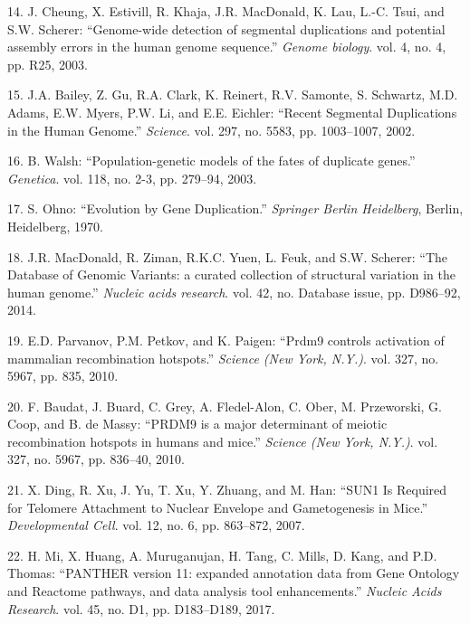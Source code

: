 \documentclass[12pt,twoside]{reedthesis}
\theoremstyle{definition}
\theoremstyle{definition}
\theoremstyle{remark}
\begin{document}
  \hypertarget{ref-Cheung2003}{}
  14. J. Cheung, X. Estivill, R. Khaja, J.R. MacDonald, K. Lau, L.-C.
  Tsui, and S.W. Scherer: ``Genome-wide detection of segmental
  duplications and potential assembly errors in the human genome
  sequence.'' \emph{Genome biology}. vol. 4, no. 4, pp. R25, 2003.
  
  \hypertarget{ref-Bailey2002}{}
  15. J.A. Bailey, Z. Gu, R.A. Clark, K. Reinert, R.V. Samonte, S.
  Schwartz, M.D. Adams, E.W. Myers, P.W. Li, and E.E. Eichler: ``Recent
  Segmental Duplications in the Human Genome.'' \emph{Science}. vol. 297,
  no. 5583, pp. 1003--1007, 2002.
  
  \hypertarget{ref-Walsh2003}{}
  16. B. Walsh: ``Population-genetic models of the fates of duplicate
  genes.'' \emph{Genetica}. vol. 118, no. 2-3, pp. 279--94, 2003.
  
  \hypertarget{ref-Ohno1970}{}
  17. S. Ohno: ``Evolution by Gene Duplication.'' \emph{Springer Berlin
  Heidelberg}, Berlin, Heidelberg, 1970.
  
  \hypertarget{ref-MacDonald2014}{}
  18. J.R. MacDonald, R. Ziman, R.K.C. Yuen, L. Feuk, and S.W. Scherer:
  ``The Database of Genomic Variants: a curated collection of structural
  variation in the human genome.'' \emph{Nucleic acids research}. vol. 42,
  no. Database issue, pp. D986--92, 2014.
  
  \hypertarget{ref-Parvanov2010}{}
  19. E.D. Parvanov, P.M. Petkov, and K. Paigen: ``Prdm9 controls
  activation of mammalian recombination hotspots.'' \emph{Science (New
  York, N.Y.)}. vol. 327, no. 5967, pp. 835, 2010.
  
  \hypertarget{ref-Baudat2010}{}
  20. F. Baudat, J. Buard, C. Grey, A. Fledel-Alon, C. Ober, M.
  Przeworski, G. Coop, and B. de Massy: ``PRDM9 is a major determinant of
  meiotic recombination hotspots in humans and mice.'' \emph{Science (New
  York, N.Y.)}. vol. 327, no. 5967, pp. 836--40, 2010.
  
  \hypertarget{ref-Ding2007}{}
  21. X. Ding, R. Xu, J. Yu, T. Xu, Y. Zhuang, and M. Han: ``SUN1 Is
  Required for Telomere Attachment to Nuclear Envelope and Gametogenesis
  in Mice.'' \emph{Developmental Cell}. vol. 12, no. 6, pp. 863--872,
  2007.
  
  \hypertarget{ref-Mi2017}{}
  22. H. Mi, X. Huang, A. Muruganujan, H. Tang, C. Mills, D. Kang, and
  P.D. Thomas: ``PANTHER version 11: expanded annotation data from Gene
  Ontology and Reactome pathways, and data analysis tool enhancements.''
  \emph{Nucleic Acids Research}. vol. 45, no. D1, pp. D183--D189, 2017.


\end{document}
